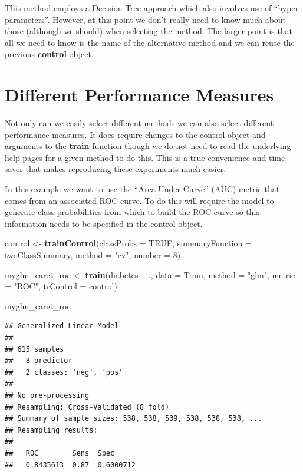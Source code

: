 \documentclass[]{book}
\newenvironment{Shaded}{\begin{snugshade}}{\end{snugshade}}
\newcommand{\KeywordTok}[1]{\textcolor[rgb]{0.13,0.29,0.53}{\textbf{#1}}}
\newcommand{\DataTypeTok}[1]{\textcolor[rgb]{0.13,0.29,0.53}{#1}}
\newcommand{\DecValTok}[1]{\textcolor[rgb]{0.00,0.00,0.81}{#1}}
\newcommand{\StringTok}[1]{\textcolor[rgb]{0.31,0.60,0.02}{#1}}
\newcommand{\OtherTok}[1]{\textcolor[rgb]{0.56,0.35,0.01}{#1}}
\newcommand{\OperatorTok}[1]{\textcolor[rgb]{0.81,0.36,0.00}{\textbf{#1}}}
\newcommand{\NormalTok}[1]{#1}
\begin{document}
This method employs a Decision Tree approach which also involves use of
``hyper parameters''. However, at this point we don't really need to
know much about those (although we should) when selecting the method.
The larger point is that all we need to know is the name of the
alternative method and we can reuse the previous \textbf{control}
object.

\section{Different Performance
Measures}\label{different-performance-measures}

Not only can we easily select different methods we can also select
different performance measures. It does require changes to the control
object and arguments to the \textbf{train} function though we do not
need to read the underlying help pages for a given method to do this.
This is a true convenience and time saver that makes reproducing these
experiments much easier.

In this example we want to use the ``Area Under Curve'' (AUC) metric
that comes from an associated ROC curve. To do this will require the
model to generate class probabilities from which to build the ROC curve
so this information needs to be specified in the control object.

\begin{Shaded}
\begin{Highlighting}[]
\NormalTok{control <-}\StringTok{ }\KeywordTok{trainControl}\NormalTok{(}\DataTypeTok{classProbs =} \OtherTok{TRUE}\NormalTok{,}
                        \DataTypeTok{summaryFunction =}\NormalTok{ twoClassSummary,}
                        \DataTypeTok{method =} \StringTok{"cv"}\NormalTok{,}
                        \DataTypeTok{number =} \DecValTok{8}\NormalTok{)}

\NormalTok{myglm_caret_roc <-}\StringTok{ }\KeywordTok{train}\NormalTok{(diabetes }\OperatorTok{~}\StringTok{ }\NormalTok{.,}
                         \DataTypeTok{data =}\NormalTok{ Train,}
                         \DataTypeTok{method =} \StringTok{"glm"}\NormalTok{,}
                         \DataTypeTok{metric =} \StringTok{"ROC"}\NormalTok{,}
                         \DataTypeTok{trControl =}\NormalTok{ control)}

\NormalTok{myglm_caret_roc}
\end{Highlighting}
\end{Shaded}

\begin{verbatim}
## Generalized Linear Model 
## 
## 615 samples
##   8 predictor
##   2 classes: 'neg', 'pos' 
## 
## No pre-processing
## Resampling: Cross-Validated (8 fold) 
## Summary of sample sizes: 538, 538, 539, 538, 538, 538, ... 
## Resampling results:
## 
##   ROC        Sens  Spec     
##   0.8435613  0.87  0.6000712
\end{verbatim}
\end{document}

